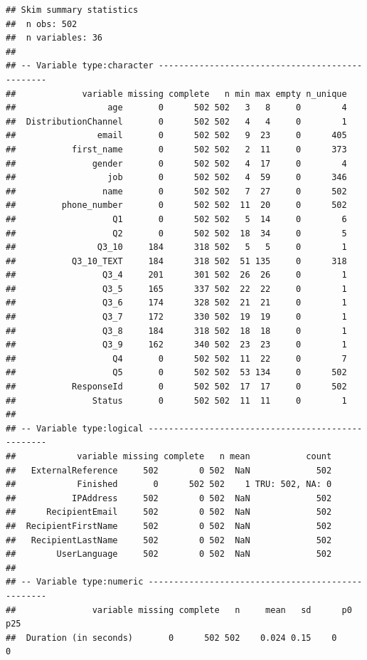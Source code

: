 \documentclass[]{book}
\begin{document}
\begin{verbatim}
## Skim summary statistics
##  n obs: 502 
##  n variables: 36 
## 
## -- Variable type:character ------------------------------------------------
##             variable missing complete   n min max empty n_unique
##                  age       0      502 502   3   8     0        4
##  DistributionChannel       0      502 502   4   4     0        1
##                email       0      502 502   9  23     0      405
##           first_name       0      502 502   2  11     0      373
##               gender       0      502 502   4  17     0        4
##                  job       0      502 502   4  59     0      346
##                 name       0      502 502   7  27     0      502
##         phone_number       0      502 502  11  20     0      502
##                   Q1       0      502 502   5  14     0        6
##                   Q2       0      502 502  18  34     0        5
##                Q3_10     184      318 502   5   5     0        1
##           Q3_10_TEXT     184      318 502  51 135     0      318
##                 Q3_4     201      301 502  26  26     0        1
##                 Q3_5     165      337 502  22  22     0        1
##                 Q3_6     174      328 502  21  21     0        1
##                 Q3_7     172      330 502  19  19     0        1
##                 Q3_8     184      318 502  18  18     0        1
##                 Q3_9     162      340 502  23  23     0        1
##                   Q4       0      502 502  11  22     0        7
##                   Q5       0      502 502  53 134     0      502
##           ResponseId       0      502 502  17  17     0      502
##               Status       0      502 502  11  11     0        1
## 
## -- Variable type:logical --------------------------------------------------
##            variable missing complete   n mean           count
##   ExternalReference     502        0 502  NaN             502
##            Finished       0      502 502    1 TRU: 502, NA: 0
##           IPAddress     502        0 502  NaN             502
##      RecipientEmail     502        0 502  NaN             502
##  RecipientFirstName     502        0 502  NaN             502
##   RecipientLastName     502        0 502  NaN             502
##        UserLanguage     502        0 502  NaN             502
## 
## -- Variable type:numeric --------------------------------------------------
##               variable missing complete   n     mean   sd      p0     p25
##  Duration (in seconds)       0      502 502    0.024 0.15    0       0   

\end{verbatim}
\end{document}
